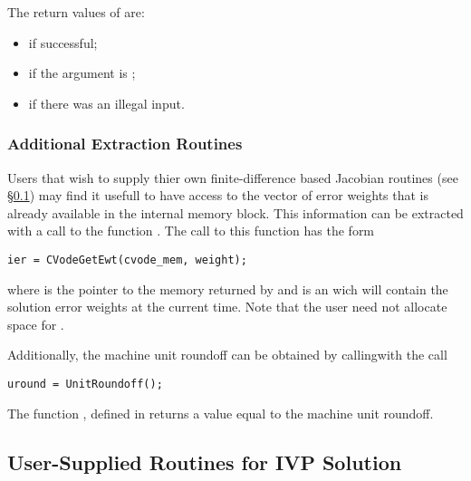 \begin{itemize}
  The return values of  are:
  \begin{itemize}
  \item {} if successful;
  \item {} if the  argument is ;
  \item {} if there was an illegal input.
  \end{itemize}         

\end{itemize}

\subsubsection{Additional Extraction Routines}\label{sss:cvodegetewt}

Users that wish to supply thier own finite-difference based Jacobian routines
(see \S\ref{ss:user_fct_sim}) may find it usefull to have access to the
vector of error weights that is already available in the {\cvode} internal 
memory block. This information can be extracted with a call to the function
.
The call to this function has the form
\begin{verbatim}
ier = CVodeGetEwt(cvode_mem, weight);
\end{verbatim}
where  is the pointer to the {\cvode} memory returned by
 and  is an {\nvector} wich will contain
the solution error weights at the current time. Note that the user need not
allocate space for .

Additionally, the machine unit roundoff can be obtained by callingwith
the call
\begin{verbatim}
uround = UnitRoundoff();
\end{verbatim}
The function , defined in  returns a
 value equal to the machine unit roundoff.

                                                                 
\subsection{User-Supplied Routines for IVP Solution}\label{ss:user_fct_sim}

